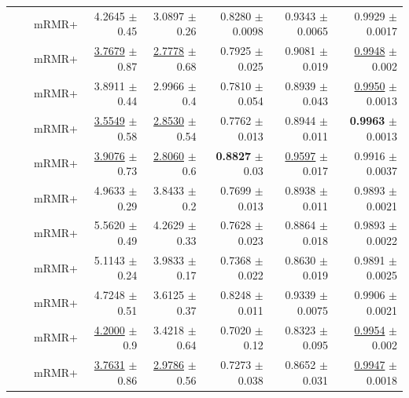 \begin{longtable}{llp{}rrrrr}
 &  & mRMR+ & 4.2645 {\scriptsize $\pm$ 0.45} & 3.0897 {\scriptsize $\pm$ 0.26} & 0.8280 {\scriptsize $\pm$ 0.0098} & 0.9343 {\scriptsize $\pm$ 0.0065} & 0.9929 {\scriptsize $\pm$ 0.0017} \\
 &  & mRMR+ & \underline{3.7679} {\scriptsize $\pm$ 0.87} & \underline{2.7778} {\scriptsize $\pm$ 0.68} & 0.7925 {\scriptsize $\pm$ 0.025} & 0.9081 {\scriptsize $\pm$ 0.019} & \underline{0.9948} {\scriptsize $\pm$ 0.002} \\
 &  & mRMR+ & 3.8911 {\scriptsize $\pm$ 0.44} & 2.9966 {\scriptsize $\pm$ 0.4} & 0.7810 {\scriptsize $\pm$ 0.054} & 0.8939 {\scriptsize $\pm$ 0.043} & \underline{0.9950} {\scriptsize $\pm$ 0.0013} \\
 &  & mRMR+ & \underline{3.5549} {\scriptsize $\pm$ 0.58} & \underline{2.8530} {\scriptsize $\pm$ 0.54} & 0.7762 {\scriptsize $\pm$ 0.013} & 0.8944 {\scriptsize $\pm$ 0.011} & \textbf{0.9963} {\scriptsize $\pm$ 0.0013} \\
 &  & mRMR+ & \underline{3.9076} {\scriptsize $\pm$ 0.73} & \underline{2.8060} {\scriptsize $\pm$ 0.6} & \textbf{0.8827} {\scriptsize $\pm$ 0.03} & \underline{0.9597} {\scriptsize $\pm$ 0.017} & 0.9916 {\scriptsize $\pm$ 0.0037} \\
 &  & mRMR+ & 4.9633 {\scriptsize $\pm$ 0.29} & 3.8433 {\scriptsize $\pm$ 0.2} & 0.7699 {\scriptsize $\pm$ 0.013} & 0.8938 {\scriptsize $\pm$ 0.011} & 0.9893 {\scriptsize $\pm$ 0.0021} \\
 &  & mRMR+ & 5.5620 {\scriptsize $\pm$ 0.49} & 4.2629 {\scriptsize $\pm$ 0.33} & 0.7628 {\scriptsize $\pm$ 0.023} & 0.8864 {\scriptsize $\pm$ 0.018} & 0.9893 {\scriptsize $\pm$ 0.0022} \\
 &  & mRMR+ & 5.1143 {\scriptsize $\pm$ 0.24} & 3.9833 {\scriptsize $\pm$ 0.17} & 0.7368 {\scriptsize $\pm$ 0.022} & 0.8630 {\scriptsize $\pm$ 0.019} & 0.9891 {\scriptsize $\pm$ 0.0025} \\
 &  & mRMR+ & 4.7248 {\scriptsize $\pm$ 0.51} & 3.6125 {\scriptsize $\pm$ 0.37} & 0.8248 {\scriptsize $\pm$ 0.011} & 0.9339 {\scriptsize $\pm$ 0.0075} & 0.9906 {\scriptsize $\pm$ 0.0021} \\
 &  & mRMR+ & \underline{4.2000} {\scriptsize $\pm$ 0.9} & 3.4218 {\scriptsize $\pm$ 0.64} & 0.7020 {\scriptsize $\pm$ 0.12} & 0.8323 {\scriptsize $\pm$ 0.095} & \underline{0.9954} {\scriptsize $\pm$ 0.002} \\
 &  & mRMR+ & \underline{3.7631} {\scriptsize $\pm$ 0.86} & \underline{2.9786} {\scriptsize $\pm$ 0.56} & 0.7273 {\scriptsize $\pm$ 0.038} & 0.8652 {\scriptsize $\pm$ 0.031} & \underline{0.9947} {\scriptsize $\pm$ 0.0018} \\

\end{longtable}
